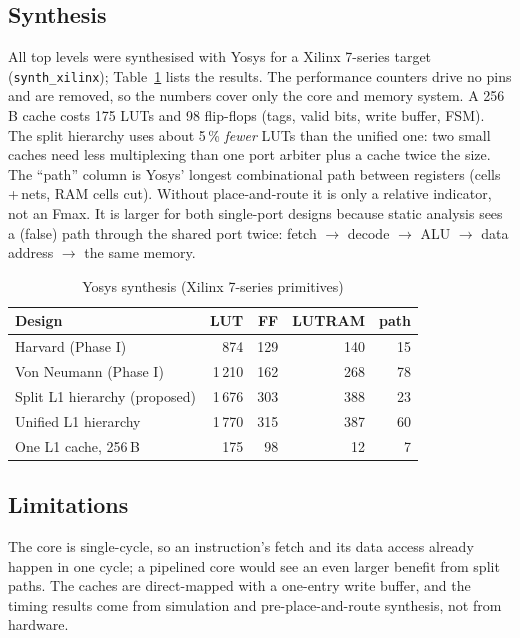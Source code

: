\documentclass[conference]{IEEEtran}
\begin{document}
\subsection{Synthesis}
All top levels were synthesised with Yosys for a Xilinx 7-series target
(\texttt{synth\_xilinx}); Table~\ref{tab:synth} lists the results. The
performance counters drive no pins and are removed, so the numbers cover only
the core and memory system. A 256\,B cache costs 175 LUTs and 98 flip-flops
(tags, valid bits, write buffer, FSM). The split hierarchy uses about 5\,\%
\emph{fewer} LUTs than the unified one: two small caches need less
multiplexing than one port arbiter plus a cache twice the size. The
``path'' column is Yosys' longest combinational path between registers
(cells\,+\,nets, RAM cells cut). Without place-and-route it is only a
relative indicator, not an Fmax. It is larger for both single-port designs
because static analysis sees a (false) path through the shared port twice:
fetch $\rightarrow$ decode $\rightarrow$ ALU $\rightarrow$ data address
$\rightarrow$ the same memory.

\begin{table}[h]
\caption{Yosys synthesis (Xilinx 7-series primitives)}
\label{tab:synth}
\centering
\setlength{\tabcolsep}{4pt}
\begin{tabular}{lrrrr}
\toprule
Design & LUT & FF & LUTRAM & path \\
\midrule
Harvard (Phase I)            & 874   & 129 & 140 & 15 \\
Von Neumann (Phase I)        & 1\,210 & 162 & 268 & 78 \\
Split L1 hierarchy (proposed)& 1\,676 & 303 & 388 & 23 \\
Unified L1 hierarchy         & 1\,770 & 315 & 387 & 60 \\
One L1 cache, 256\,B         & 175   & 98  & 12  & 7 \\
\bottomrule
\end{tabular}
\end{table}

\subsection{Limitations}
The core is single-cycle, so an instruction's fetch and its data access
already happen in one cycle; a pipelined core would see an even larger
benefit from split paths. The caches are direct-mapped with a one-entry
write buffer, and the timing results come from simulation and
pre-place-and-route synthesis, not from hardware.
\end{document}
